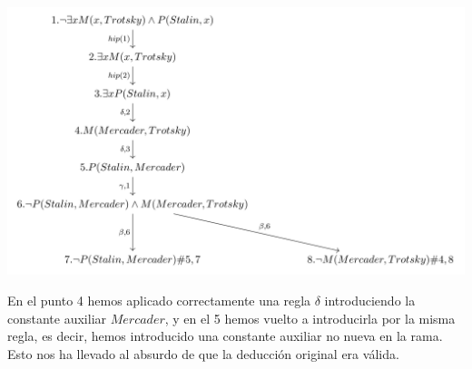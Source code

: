 \begin{example}

\begin{center}
\includegraphics[scale = 0.36]{figures/tableau3.png}
\end{center}

En el punto 4 hemos aplicado correctamente una regla $\delta$ introduciendo la constante auxiliar $Mercader$, y en el 5 hemos vuelto a introducirla por la misma regla, es decir, hemos introducido una constante auxiliar no nueva en la rama. Esto nos ha llevado al absurdo de que la deducción original era válida.  
\end{example}


